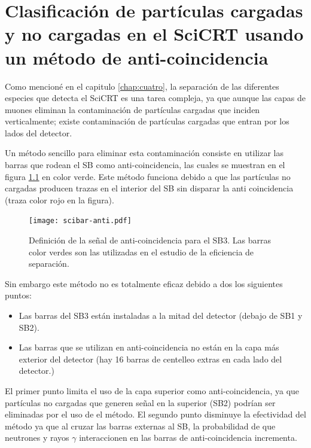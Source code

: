 
\chapter{Clasificación de partículas cargadas y no cargadas en el SciCRT usando un método de anti-coincidencia}
\label{chap:apen-a}

Como mencioné en el capitulo \ref{chap:cuatro}, la separación de las diferentes especies que detecta el SciCRT es una tarea compleja, ya que aunque las capas de muones eliminan la contaminación de partículas cargadas que inciden verticalmente; existe contaminación de partículas cargadas que entran por los lados del detector.

Un método sencillo para eliminar esta contaminación consiste en utilizar las barras que rodean el SB como anti-coincidencia, las cuales se muestran en el figura \ref{fig:scibar-anti} en color verde. Este método funciona debido a que las partículas no cargadas producen trazas en el interior del SB sin disparar la anti coincidencia (traza color rojo en la figura).

\begin{figure}
        \centering
        \texttt{[image: scibar-anti.pdf]}
        \caption{Definición de la señal de anti-coincidencia para el SB3. Las barras color verdes son las utilizadas en el estudio de la eficiencia de separación.}
        \label{fig:scibar-anti}
\end{figure}

Sin embargo este método no es totalmente eficaz debido a dos los siguientes puntos:

\begin{itemize}
  \item Las barras del SB3 están instaladas a la mitad del detector (debajo de SB1 y SB2).
  \item Las barras que se utilizan en anti-coincidencia no están en la capa más exterior del detector (hay \num{16} barras de centelleo extras en cada lado del detector.)
\end{itemize}

El primer punto limita el uso de la capa superior como anti-coincidencia, ya que partículas no cargadas que generen señal en la superior (SB2) podrían ser eliminadas por el uso de el método. El segundo punto disminuye la efectividad del método ya que al cruzar las barras externas al SB, la probabilidad de que neutrones y rayos $\gamma$ interaccionen en las barras de anti-coincidencia incrementa.


